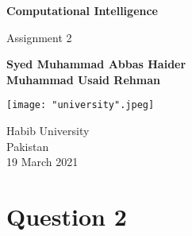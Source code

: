 \documentclass[12pt]{exam}
\begin{document}
\setlength{\parskip}{10pt} %
\setlength{\parindent}{20pt}

\begin{titlepage}
    \begin{center}
        
        {\Huge
        \textbf{Computational Intelligence}}
 
        \vspace{0.5cm}
        
        {\Huge Assignment 2}
    
        
        \vspace{2.0 cm}
        \Large
        \textbf{Syed Muhammad Abbas Haider } \\
        \vspace{0.5cm}
        \textbf{Muhammad Usaid Rehman} \\
        
        \vfill
 
        \vspace{2cm}
     	\texttt{[image: "university".jpeg]}
 
        \LARGE
        Habib University \\
        Pakistan\\
        19 March 2021\\
        
        
 
    \end{center}
\end{titlepage}


\section{Question 2}
\end{document}
